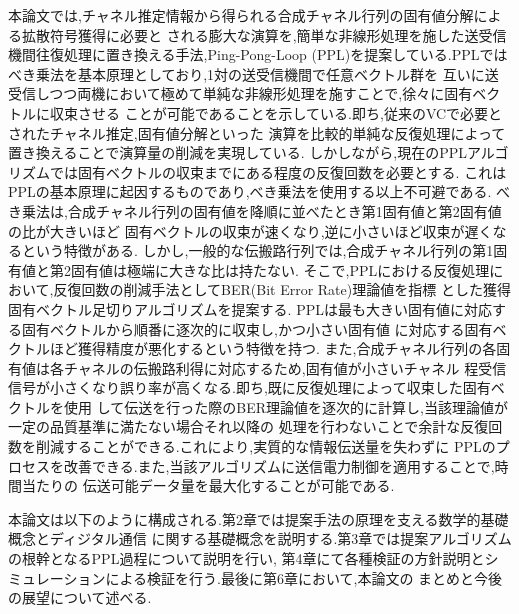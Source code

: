 本論文では,チャネル推定情報から得られる合成チャネル行列の固有値分解による拡散符号獲得に必要と
される膨大な演算を,簡単な非線形処理を施した送受信機間往復処理に置き換える手法,Ping-Pong-Loop
(PPL)を提案している.PPLではべき乗法を基本原理としており,1対の送受信機間で任意ベクトル群を
互いに送受信しつつ両機において極めて単純な非線形処理を施すことで,徐々に固有ベクトルに収束させる
ことが可能であることを示している.即ち,従来のVCで必要とされたチャネル推定,固有値分解といった
演算を比較的単純な反復処理によって置き換えることで演算量の削減を実現している.
しかしながら,現在のPPLアルゴリズムでは固有ベクトルの収束までにある程度の反復回数を必要とする.
これはPPLの基本原理に起因するものであり,べき乗法を使用する以上不可避である.
べき乗法は,合成チャネル行列の固有値を降順に並べたとき第1固有値と第2固有値の比が大きいほど
固有ベクトルの収束が速くなり,逆に小さいほど収束が遅くなるという特徴がある.
しかし,一般的な伝搬路行列では,合成チャネル行列の第1固有値と第2固有値は極端に大きな比は持たない.
そこで,PPLにおける反復処理において,反復回数の削減手法としてBER(Bit Error Rate)理論値を指標
とした獲得固有ベクトル足切りアルゴリズムを提案する.
PPLは最も大きい固有値に対応する固有ベクトルから順番に逐次的に収束し,かつ小さい固有値
に対応する固有ベクトルほど獲得精度が悪化するという特徴を持つ.
また,合成チャネル行列の各固有値は各チャネルの伝搬路利得に対応するため,固有値が小さいチャネル
程受信信号が小さくなり誤り率が高くなる.即ち,既に反復処理によって収束した固有ベクトルを使用
して伝送を行った際のBER理論値を逐次的に計算し,当該理論値が一定の品質基準に満たない場合それ以降の
処理を行わないことで余計な反復回数を削減することができる.これにより,実質的な情報伝送量を失わずに
PPLのプロセスを改善できる.また,当該アルゴリズムに送信電力制御を適用することで,時間当たりの
伝送可能データ量を最大化することが可能である.

本論文は以下のように構成される.第2章では提案手法の原理を支える数学的基礎概念とディジタル通信
に関する基礎概念を説明する.第3章では提案アルゴリズムの根幹となるPPL過程について説明を行い,
第4章にて各種検証の方針説明とシミュレーションによる検証を行う.最後に第6章において,本論文の
まとめと今後の展望について述べる.